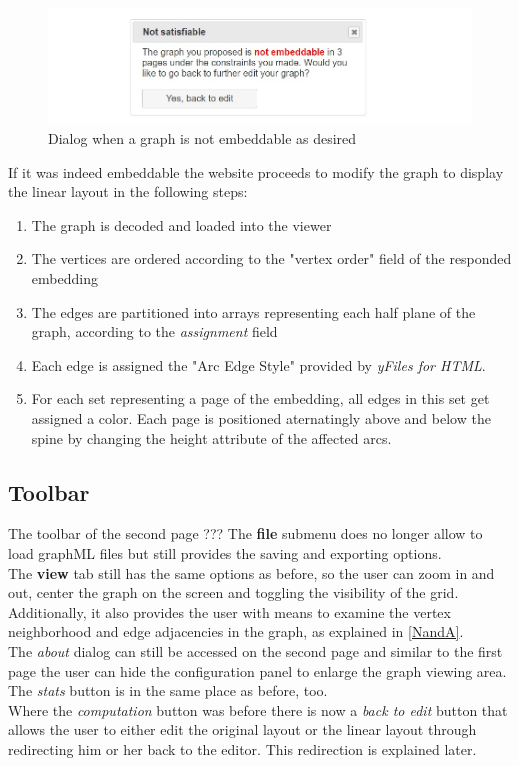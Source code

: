 \begin{figure}
\begin{center}
\includegraphics[width=\textwidth]{figures/figSecond/NotEmbeddable.jpg}
\caption{Dialog when a graph is not embeddable as desired}
\label{NoEmb}
\end{center}
\label{notSat}
\end{figure}
\noindent If it was indeed embeddable the website proceeds to modify the graph to display the linear layout in the following steps:
\begin{enumerate}
\item The graph is decoded and loaded into the viewer
\item The vertices are ordered according to the "vertex order" field of the responded embedding
\item The edges are partitioned into arrays representing each half plane of the graph, according to the \textit{assignment} field\\
\item Each edge is assigned the "Arc Edge Style" provided by \textit{yFiles for HTML}. 
\item For each set representing a page of the embedding, all edges in this set get assigned a color. Each page is positioned aternatingly above and below the spine by changing the height attribute of the affected arcs.\\
\end{enumerate}
\subsection{Toolbar}
The toolbar of the second page ???
The \textbf{file} submenu does no longer allow to load graphML files but still provides the saving and exporting options.\\[12pt]
The \textbf{view} tab still has the same options as before, so the user can zoom in and out, center the graph on the screen and toggling the visibility of the grid.\\
Additionally, it also provides the user with means to examine the vertex neighborhood and edge adjacencies in the graph, as explained in \autoref{NandA}.\\
The \textit{about} dialog can still be accessed on the second page and similar to the first page the user can hide the configuration panel to enlarge the graph viewing area. The \textit{stats} button is in the same place as before, too.\\
Where the \textit{computation} button was before there is now a \textit{back to edit} button that allows the user to either edit the original layout or the linear layout through redirecting him or her back to the editor. This redirection is explained later.
